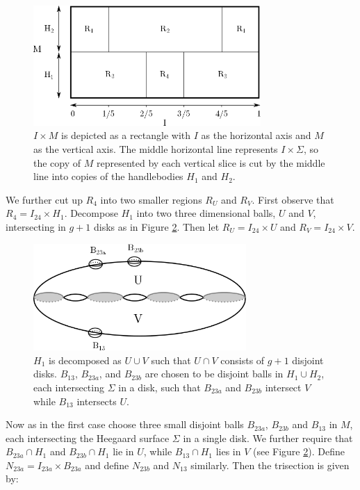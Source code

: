 \documentclass[12pt]{amsart}
\theoremstyle{definition}
\theoremstyle{remark}
\begin{document}
\begin{figure}[h]
\centering
\includegraphics[height=1.8in]{MxS1_preserves.png}
\caption{$I \times M$ is depicted as a rectangle with $I$ as the horizontal axis and $M$ as the vertical axis.  The middle horizontal line represents $I \times \Sigma$, so the copy of $M$ represented by each vertical slice is cut by the middle line into copies of the handlebodies $H_1$ and $H_2$.}
\label{preservebreakdown}
\end{figure}

We further cut up $R_4$ into two smaller regions $R_U$ and $R_V$.  First observe that $R_4 = I_{24} \times H_1$.  Decompose $H_1$ into two three dimensional balls, $U$ and $V$, intersecting in $g+1$ disks as in Figure \ref{fig_disjointballs}.  Then let $R_U = I_{24}  \times U$ and $R_V = I_{24} \times V$.  

\begin{figure}[h]
\centering
\includegraphics[height=1.6in]{disjointballs.png}
\caption{$H_1$ is decomposed as $U \cup V$ such that $U \cap V$ consists of $g+1$ disjoint disks.  $B_{13}$, $B_{23a}$, and $B_{23b}$ are chosen to be disjoint balls in $H_1 \cup H_2$, each intersecting $\Sigma$ in a disk, such that $B_{23a}$ and $B_{23b}$ intersect $V$ while $B_{13}$ intersects $U$.}
\label{fig_disjointballs}
\end{figure}


Now as in the first case choose three small disjoint balls $B_{23a}$, $B_{23b}$ and $B_{13}$ in $M$, each intersecting the Heegaard surface $\Sigma$ in a single disk.  We further require that $B_{23a} \cap H_1$ and $B_{23b} \cap H_1$ lie in $U$, while $B_{13} \cap H_1$ lies in $V$ (see Figure \ref{fig_disjointballs}).  Define $N_{23a} = I_{23a} \times B_{23a}$ and define $N_{23b}$ and $N_{13}$ similarly.  Then the trisection is given by:
\end{document}
